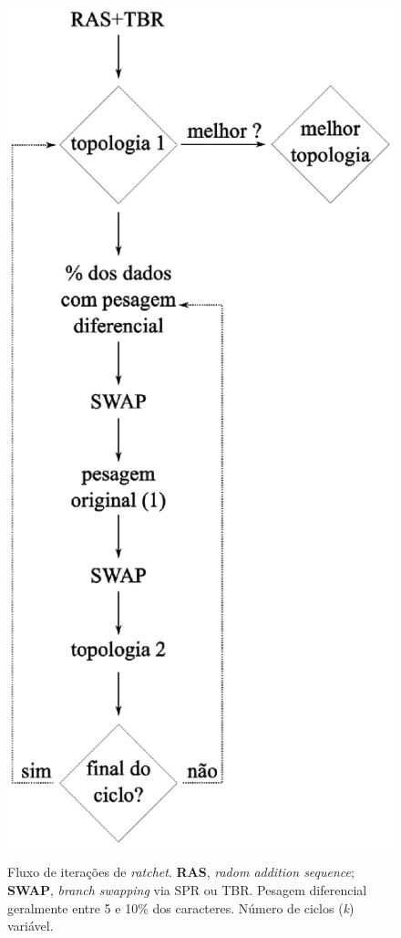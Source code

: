 \begin{refsection}
  \begin{figure}[H]
       \centering
      {\includegraphics[scale=0.80]{figures/tut5/ratchet.eps}}
	{\caption[Fluxo de iterações de \textit{ratchet}]{Fluxo de iterações de \textit{ratchet}. \textbf{RAS}, \textit{radom addition sequence}; \textbf{SWAP}, \textit{branch swapping} via SPR ou TBR. Pesagem diferencial geralmente entre 5 e 10\% dos caracteres. Número de ciclos (\textit{k}) variável.}\label{tut5:fig:ratchet}}
  \end{figure}


\end{refsection}
